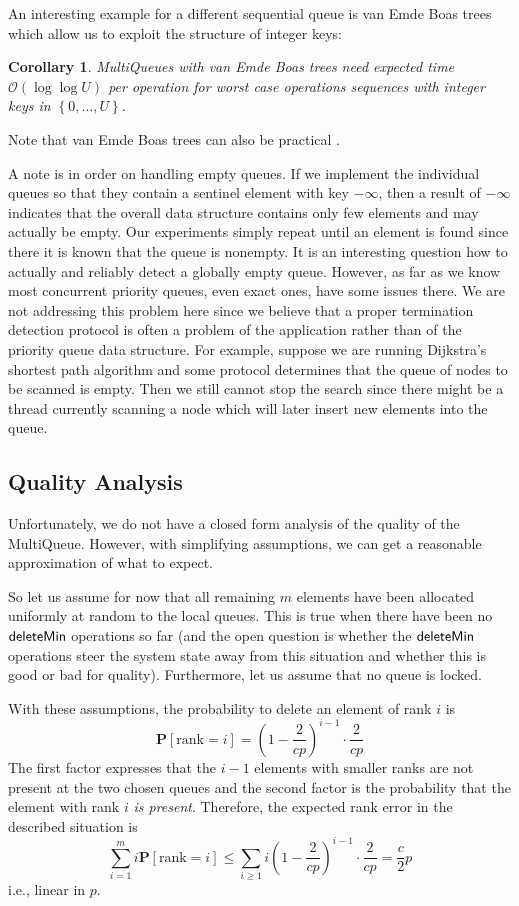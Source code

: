 \documentclass[a4paper,12pt]{article}
\newcommand{\Id}[1]{\ensuremath{\text{{\sf #1}}}}
\newcommand{\set}[1]{\left\{ #1\right\}}
\newcommand{\prob}[1]{{\mathbf{P}}\left[#1\right]}
\newcommand{\Oh}[1]{\mathcal{O}\!\left( #1\right)}
\newtheorem{corollary}[theorem]{Corollary}
\begin{document}
An interesting example for a different sequential queue is van Emde Boas trees \cite{Emde77}
which allow us to exploit the structure of integer keys:

\begin{corollary}
MultiQueues with van Emde Boas trees need expected time $\Oh{\log\log U}$ per operation for worst case operations sequences with integer keys in $\set{0,\ldots,U}$.
\end{corollary}
Note that van Emde Boas trees can also be practical \cite{DKMS04}.


A note is in order on handling empty queues. If we implement the individual queues so that they contain a sentinel element with key $-\infty$, then a result of $-\infty$ indicates that the overall data structure contains only few elements and may actually be empty. Our experiments simply repeat until an element is found since there it is known that the queue is nonempty. It is an interesting question how to actually and reliably detect a globally empty queue. However, as far as we know most concurrent priority queues, even exact ones, have some issues there. We are not addressing this problem here since we believe that a proper termination detection protocol is often a problem of the application rather than of the priority queue data structure. For example, suppose we are running Dijkstra's shortest path algorithm and some protocol determines that the queue of nodes to be scanned is empty. Then we still cannot stop the search since there might be a thread currently scanning a node which will later insert new elements into the queue.

\subsection{Quality Analysis}\label{ss:analysis}

Unfortunately, we do not have a closed form analysis of the quality of the MultiQueue. However, with simplifying assumptions, we can get a reasonable approximation of what to expect. 

So let us assume for now that all remaining $m$ elements have been allocated uniformly at random to the local queues. This is true when there have been no \Id{deleteMin} operations so far (and the open question is whether the \Id{deleteMin} operations steer the system state away from this situation and whether this is good or bad for quality). Furthermore, let us assume that no queue is locked. 

With these assumptions, the probability to delete an element of rank $i$ is 
$$\prob{\mathrm{rank}=i}=\left(1-\frac{2}{cp}\right)^{i-1}\cdot\frac{2}{cp}$$
The first factor expresses that the $i-1$ elements with smaller ranks are not present at the two chosen queues and the second factor is the probability that the element with rank $i$ \emph{is present}. 
Therefore, the expected rank error in the described situation is  
\begin{equation}\label{eq:eRank}\sum_{i=1}^mi\prob{\mathrm{rank}=i}\leq
  \sum_{i\geq 1}i\left(1-\frac{2}{cp}\right)^{i-1}\cdot\frac{2}{cp}=\frac{c}{2}p
\end{equation}
i.e., linear in $p$. 
\end{document}

